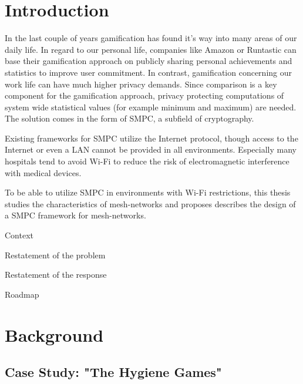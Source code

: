 \tableofcontents
\setcounter{page}{2}
\listoffigures
{\let\clearpage\relax \listoftables}

\printnoidxglossary[type=\acronymtype,title={List of Acronyms}]

{\let\clearpage\relax \printnoidxglossary[type=symbols,sort=letter]}

\chapter{Introduction}
In the last couple of years gamification has found it's way into many areas of our daily life. In regard to our personal life, companies like Amazon or Runtastic can base their gamification approach on publicly sharing personal achievements and statistics to improve user commitment. In contrast, gamification concerning our work life can have much higher privacy demands. Since comparison is a key component for the gamification approach, privacy protecting computations of system wide statistical values (for example minimum and maximum) are needed. The solution comes in the form of \gls{SMPC}, a subfield of cryptography.

Existing frameworks for \gls{SMPC} utilize the Internet protocol, though access to the Internet or even a \gls{LAN} cannot be provided in all environments. Especially many hospitals tend to avoid Wi-Fi to reduce the risk of electromagnetic interference with medical devices.

To be able to utilize \gls{SMPC} in environments with Wi-Fi restrictions, this thesis studies the characteristics of mesh-networks and proposes describes the design of a \gls{SMPC} framework for mesh-networks. 

Context

Restatement of the problem

Restatement of the response

Roadmap

\chapter{Background }

	\section{Case Study: "The Hygiene Games"}

